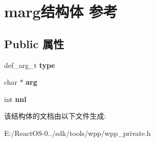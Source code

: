 \hypertarget{structmarg}{}\section{marg结构体 参考}
\label{structmarg}
\subsection*{Public 属性}
\begin{DoxyCompactItemize}
\item 
\mbox{\label{structmarg_adc012c9d219da22239e0c9ae516a8a3b}} 
def\+\_\+arg\+\_\+t {\bfseries type}
\item 
\mbox{\label{structmarg_a06525282ca06b8c9dae830a2eb69c149}} 
char $\ast$ {\bfseries arg}
\item 
\mbox{\label{structmarg_aa1a5046037e0c8ba583ef74a2d846360}} 
int {\bfseries nnl}
\end{DoxyCompactItemize}


该结构体的文档由以下文件生成\+:\begin{DoxyCompactItemize}
\item 
E\+:/\+React\+O\+S-\/0../sdk/tools/wpp/wpp\+\_\+private.\+h\end{DoxyCompactItemize}
